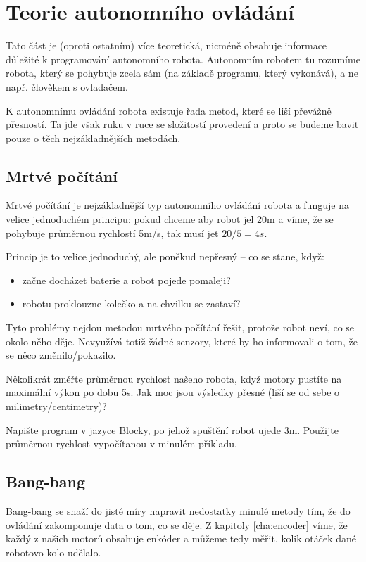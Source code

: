 \documentclass[../main.tex]{subfiles}
\begin{document}
	\section{Teorie autonomního ovládání}

	Tato část je (oproti ostatním) více teoretická, nicméně obsahuje informace důležité k programování autonomního robota. Autonomním robotem tu rozumíme robota, který se pohybuje zcela sám (na základě programu, který vykonává), a ne např. člověkem s ovladačem.

	K autonomnímu ovládání robota existuje řada metod, které se liší převážně přesností. Ta jde však  ruku v ruce se složitostí provedení a proto se budeme bavit pouze o těch nejzákladnějších metodách.

	\subsection{Mrtvé počítání}
	Mrtvé počítání je nejzákladnější typ autonomního ovládání robota a funguje na velice jednoduchém principu: pokud chceme aby robot jel \si{20m} a víme, že se pohybuje průměrnou rychlostí \si{5m/s}, tak musí jet $20 / 5 = \si{4s}$.

	Princip je to velice jednoduchý, ale poněkud nepřesný -- co se stane, když:
	\begin{itemize}
		\item začne docházet baterie a robot pojede pomaleji?
		\item robotu proklouzne kolečko a na chvilku se zastaví?
	\end{itemize}

	Tyto problémy nejdou metodou mrtvého počítání řešit, protože robot neví, co se okolo něho děje. Nevyužívá totiž žádné senzory, které by ho informovali o tom, že se něco změnilo/pokazilo.

	\begin{question}
		Několikrát změřte průměrnou rychlost našeho robota, když motory pustíte na maximální výkon po dobu \si{5s}. Jak moc jsou výsledky přesné (liší se od sebe o milimetry/centimetry)?
	\end{question}

	\begin{question}
		Napište program v jazyce Blocky, po jehož spuštění robot ujede \si{3m}. Použijte průměrnou rychlost vypočítanou v minulém příkladu.
	\end{question}

	\subsection{Bang-bang}
	Bang-bang se snaží do jisté míry napravit nedostatky minulé metody tím, že do ovládání zakomponuje data o tom, co se děje. Z kapitoly \ref{cha:encoder} víme, že každý z našich motorů obsahuje enkóder a můžeme tedy měřit, kolik otáček dané robotovo kolo udělalo.
\end{document}

